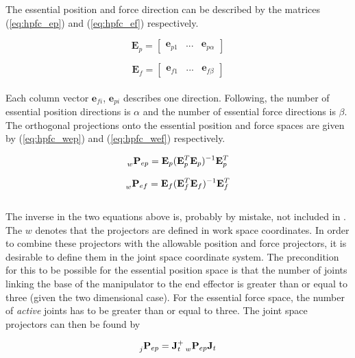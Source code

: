 The essential position and force direction can be described by the matrices (\ref{eq:hpfc_ep}) and (\ref{eq:hpfc_ef}) respectively.

\begin{equation}\label{eq:hpfc_ep}
    \mathbf{E}_p =
    \begin{bmatrix}
        \mathbf{e}_{p1} & ... & \mathbf{e}_{p\alpha}
    \end{bmatrix}
\end{equation}

\begin{equation}\label{eq:hpfc_ef}
    \mathbf{E}_f =
    \begin{bmatrix}
        \mathbf{e}_{f1} & ... & \mathbf{e}_{f\beta}
    \end{bmatrix}
\end{equation}
\\
Each column vector $\mathbf{e}_{fi}$, $\mathbf{e}_{pi}$ describes one direction. Following, the number of essential position directions is $\alpha$ and the number of essential force directions is $\beta$. The orthogonal projections onto the essential position and force spaces are given by (\ref{eq:hpfc_wep}) and (\ref{eq:hpfc_wef}) respectively.

\begin{equation}\label{eq:hpfc_wep}
    \prescript{}{w}{\mathbf{P}}_{ep} = \mathbf{E}_p(\mathbf{E}_p^T \mathbf{E}_p)^{-1} \mathbf{E}_p^T
\end{equation}

\begin{equation}\label{eq:hpfc_wef}
    \prescript{}{w}{\mathbf{P}}_{ef} = \mathbf{E}_f(\mathbf{E}_f^T \mathbf{E}_f)^{-1} \mathbf{E}_f^T
\end{equation}
\\
The inverse in the two equations above is, probably by mistake, not included in \cite{west1985method}. The $w$ denotes that the projectors are defined in work space coordinates. In order to combine these projectors with the allowable position and force projectors, it is desirable to define them in the joint space coordinate system. The precondition for this to be possible for the essential position space is that the number of joints linking the base of the manipulator to the end effector is greater than or equal to three (given the two dimensional case). For the essential force space, the number of \textit{active} joints has to be greater than or equal to three. The joint space projectors can then be found by

\begin{equation}\label{eq:hpfc_jep}
    \prescript{}{j}{\mathbf{P}}_{ep} = \mathbf{J}_t^+ \prescript{}{w}{\mathbf{P}}_{ep} \mathbf{J}_t
\end{equation}

